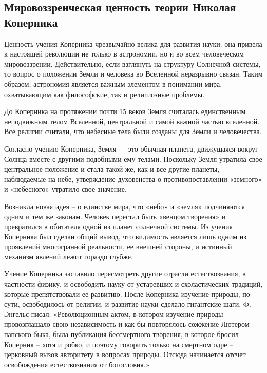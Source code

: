 \documentclass[
]{article}
\begin{document}
\hypertarget{ux43cux438ux440ux43eux432ux43eux437ux437ux440ux435ux43dux447ux435ux441ux43aux430ux44f-ux446ux435ux43dux43dux43eux441ux442ux44c-ux442ux435ux43eux440ux438ux438-ux43dux438ux43aux43eux43bux430ux44f-ux43aux43eux43fux435ux440ux43dux438ux43aux430}{%
\subsection{Мировоззренческая ценность теории Николая
Коперника}\label{ux43cux438ux440ux43eux432ux43eux437ux437ux440ux435ux43dux447ux435ux441ux43aux430ux44f-ux446ux435ux43dux43dux43eux441ux442ux44c-ux442ux435ux43eux440ux438ux438-ux43dux438ux43aux43eux43bux430ux44f-ux43aux43eux43fux435ux440ux43dux438ux43aux430}}

Ценность учения Коперника чрезвычайно велика для развития науки: она
привела к настоящей революции не только в астрономии, но и во всем
человеческом мировоззрении. Действительно, если взглянуть на структуру
Солнечной системы, то вопрос о положении Земли и человека во Вселенной
неразрывно связан. Таким образом, астрономия является важным элементом в
понимании мира, охватывающим как философские, так и религиозные
проблемы.

До Коперника на протяжении почти 15 веков Земля считалась единственным
неподвижным телом Вселенной, центральной и самой важной частью
вселенной. Все религии считали, что небесные тела были созданы для Земли
и человечества.

Согласно учению Коперника, Земля --- \hspace{0pt}\hspace{0pt}это обычная
планета, движущаяся вокруг Солнца вместе с другими подобными ему телами.
Поскольку Земля утратила свое центральное положение и стала такой же,
как и все другие планеты, наблюдаемые на небе, утверждение духовенства о
противопоставлении «земного» и «небесного» утратило свое значение.

Возникла новая идея -- о единстве мира, что «небо» и «земля» подчиняются
одним и тем же законам. Человек перестал быть «венцом творения» и
превратился в обитателя одной из планет солнечной системы. Из учения
Коперника был сделан общий вывод, что видимость является лишь одним из
проявлений многогранной реальности, ее внешней стороны, и истинный
механизм явлений лежит гораздо глубже.

Учение Коперника заставило пересмотреть другие отрасли естествознания, в
частности физику, и освободить науку от устаревших и схоластических
традиций, которые препятствовали ее развитию. После Коперника изучение
природы, по сути, освободилось от религии, и развитие науки сделало
гигантские шаги. Ф. Энгельс писал: «Революционным актом, в котором
изучение природы провозглашало свою независимость и как бы повторялось
сожжение Лютером папского быка, была публикация бессмертного творения, в
которое бросил Коперник -- хотя и робко, и поэтому говорить только на
смертном одре -- церковный вызов авторитету в вопросах природы. Отсюда
начинается отсчет освобождения естествознания от богословия.»
\end{document}
